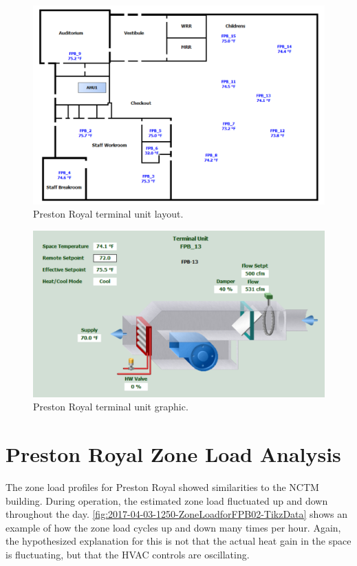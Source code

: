 \begin{figure}
\centering
\includegraphics[width=\textwidth]{Images/PrestonRoyalFPBLayoutGraphic.PNG}
\caption{Preston Royal terminal unit layout.}
\label{fig:PrestonRoyalTerminalUnitLayout}
\end{figure}

\begin{figure}
\centering
\includegraphics[width=\textwidth]{Images/PrestonRoyalTerminalUnitGraphic.PNG}
\caption{Preston Royal terminal unit graphic. }
\label{fig:PrestonRoyalTerminalUnitGraphic}
\end{figure}



\section{Preston Royal Zone Load Analysis}

The zone load profiles for Preston Royal showed similarities            
to the NCTM building. During operation, the estimated zone              
load fluctuated up and down throughout the day. \figref{}               
\ref{fig:2017-04-03-1250-ZoneLoadforFPB02-TikzData} shows an example of 
how the zone load cycles up and down many times per hour. Again, the    
hypothesized explanation for this is not that the actual heat gain in   
the space is fluctuating, but that the HVAC controls are oscillating.   

